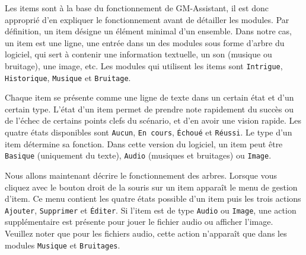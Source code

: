 \documentclass[a4paper,12pt]{article}
\newcommand*{\GMA}{GM-Assistant\xspace}
\newcommand*{\interfaceitem}[1]{\texttt{#1}}
\begin{document}
Les items sont à la base du fonctionnement de \GMA, il est donc approprié d'en expliquer le fonctionnement avant de détailler les modules.
Par définition, un item désigne un élément minimal d'un ensemble.
Dans notre cas, un item est une ligne, une entrée dans un des modules sous forme d'arbre du logiciel, qui sert à contenir une information textuelle, un son (musique ou bruitage), une image, etc.
Les modules qui utilisent les items sont \interfaceitem{Intrigue}, \interfaceitem{Historique}, \interfaceitem{Musique} et \interfaceitem{Bruitage}.

Chaque item se présente comme une ligne de texte dans un certain état et d'un certain type.
L'état d'un item permet de prendre note rapidement du succès ou de l'échec de certains points clefs du scénario, et d'en avoir une vision rapide.
Les quatre états disponibles sont \interfaceitem{Aucun}, \interfaceitem{En cours}, \interfaceitem{Échoué} et \interfaceitem{Réussi}.
Le type d'un item détermine sa fonction.
Dans cette version du logiciel, un item peut être \interfaceitem{Basique} (uniquement du texte), \interfaceitem{Audio} (musiques et bruitages) ou \interfaceitem{Image}.

Nous allons maintenant décrire le fonctionnement des arbres.
Lorsque vous cliquez avec le bouton droit de la souris sur un item apparaît le menu de gestion d'item.
Ce menu contient les quatre états possible d'un item puis les trois actions \interfaceitem{Ajouter}, \interfaceitem{Supprimer} et \interfaceitem{Éditer}.
Si l'item est de type \interfaceitem{Audio} ou \interfaceitem{Image}, une action supplémentaire est présente pour jouer le fichier audio ou afficher l'image.
Veuillez noter que pour les fichiers audio, cette action n'apparaît que dans les modules \interfaceitem{Musique} et \interfaceitem{Bruitages}.
\end{document}
